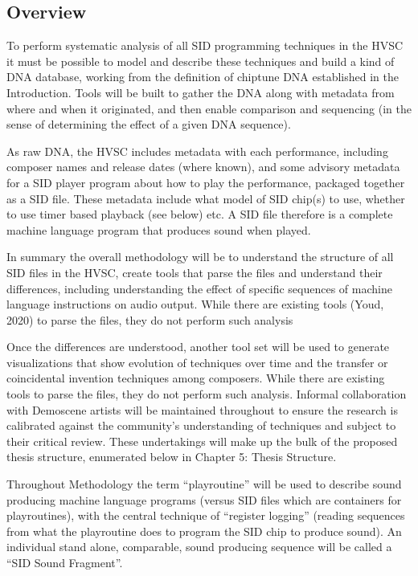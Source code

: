 \documentclass[10pt]{article}
\begin{document}
\begin{multicols*}{2}
    \subsection{Overview}

To perform systematic analysis of all SID programming techniques in the HVSC it must be possible to model and describe these techniques and build a kind of DNA database, working from the definition of chiptune DNA established in the Introduction. Tools will be built to gather the DNA along with metadata from where and when it originated, and then enable comparison and sequencing (in the sense of determining the effect of a given DNA sequence).

As raw DNA, the HVSC includes metadata with each performance, including composer names and release dates (where known), and some advisory metadata for a SID player program about how to play the performance, packaged together as a SID file. These metadata include what model of SID chip(s) to use, whether to use timer based playback (see below) etc. A SID file therefore is a complete machine language program that produces sound when played.

In summary the overall methodology will be to understand the structure of all SID files in the HVSC, create tools that parse the files and understand their differences, including understanding the effect of specific sequences of machine language instructions on audio output. While there are existing tools (Youd, 2020) to parse the files, they do not perform such analysis

Once the differences are understood, another tool set will be used to generate visualizations that show evolution of techniques over time and the transfer or coincidental invention techniques among composers. While there are existing tools\cite{ChiptuneSAK} to parse the files, they do not perform such analysis. Informal collaboration with Demoscene artists will be maintained throughout to ensure the research is calibrated against the community’s understanding of techniques and subject to their critical review. These undertakings will make up the bulk of the proposed thesis structure, enumerated below in Chapter 5: Thesis Structure.

Throughout Methodology the term “playroutine” will be used to describe sound producing machine language programs (versus SID files which are containers for playroutines), with the central technique of “register logging” (reading sequences from what the playroutine does to program the SID chip to produce sound). An individual stand alone, comparable, sound producing sequence will be called a “SID Sound Fragment”.


\end{multicols*}
\end{document}
